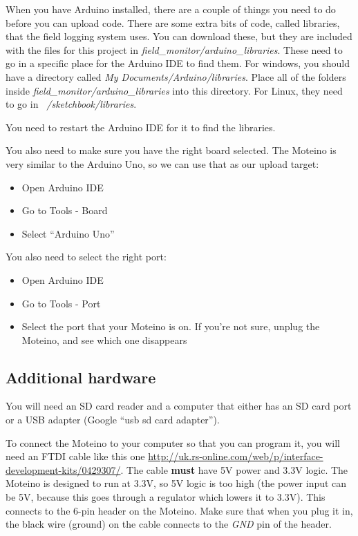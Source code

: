 \documentclass[10pt]{article}
\begin{document}
When you have Arduino installed, there are a couple of things you need to do before you can upload code. There are some extra bits of code, called libraries, that the
field logging system uses. You can download these, but they are included with the files for this project in \textit{field\_monitor/arduino\_libraries}. These need to
go in a specific place for the Arduino IDE to find them. For windows, you should have a directory called \textit{My Documents/Arduino/libraries}. Place all of the folders
inside \textit{field\_monitor/arduino\_libraries} into this directory. For Linux, they need to go in \textit{~/sketchbook/libraries}. 

You need to restart the Arduino IDE for it to find the libraries.

You also need to make sure you have the right board selected. The Moteino is very similar to the Arduino Uno, so we can use that as our upload target:

\begin{itemize}
 \item Open Arduino IDE 
 \item Go to Tools - Board
 \item Select ``Arduino Uno''
\end{itemize}

You also need to select the right port:

\begin{itemize}
 \item Open Arduino IDE 
 \item Go to Tools - Port
 \item Select the port that your Moteino is on. If you're not sure, unplug the Moteino, and see which one disappears
\end{itemize}

\subsection{Additional hardware}
You will need an SD card reader and a computer that either has an SD card port or a USB adapter (Google ``usb sd card adapter'').

To connect the Moteino to your computer so that you can program it, you will need an FTDI cable like this one
\url{http://uk.rs-online.com/web/p/interface-development-kits/0429307/}. The cable \textbf{must} have 5V power and 3.3V logic. The Moteino is designed to run at 3.3V,
so 5V logic is too high (the power input can be 5V, because this goes through a regulator which lowers it to 3.3V). This connects to the 6-pin header on the Moteino. Make
sure that when you plug it in, the black wire (ground) on the cable connects to the \textit{GND} pin of the header.
\end{document}
